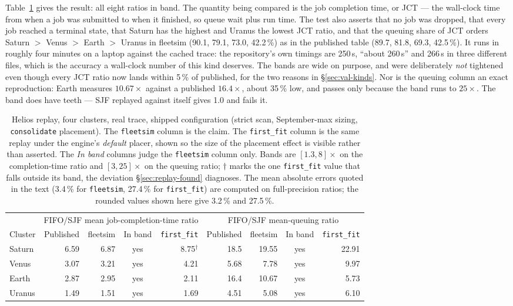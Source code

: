 Table~\ref{tab:helios-ratios} gives the result: all eight ratios in band. The
quantity being compared is the job completion time, or JCT --- the wall-clock
time from when a job was submitted to when it finished, so queue wait plus run
time. The test also asserts that no job was dropped, that every job reached a
terminal state, that Saturn has the highest and Uranus the lowest JCT ratio, and
that the queuing share of JCT orders Saturn $>$ Venus $>$ Earth $>$ Uranus in
fleetsim (90.1, 79.1, 73.0, 42.2\,\%) as in the published table (89.7, 81.8,
69.3, 42.5\,\%). It runs in roughly four minutes on a laptop against the cached
trace: the repository's own timings are 250\,s, ``about 260\,s'' and 266\,s in
three different files, which is the accuracy a wall-clock number of this kind
deserves. The bands are wide on purpose, and were deliberately \emph{not}
tightened even though every JCT ratio now lands within 5\,\% of published, for
the two reasons in \S\ref{sec:val-kinds}. Nor is the queuing column an exact
reproduction: Earth measures $10.67\times$ against a published $16.4\times$,
about 35\,\% low, and passes only because the band runs to $25\times$. The band
does have teeth --- SJF replayed against itself gives 1.0 and fails it.

\begin{table}[t]
\centering\small
\caption{Helios replay, four clusters, real trace, shipped configuration (strict
scan, September-max sizing, \texttt{consolidate} placement). The
\texttt{fleetsim} column is the claim. The \texttt{first\_fit} column is the same
replay under the engine's \emph{default} placer, shown so the size of the
placement effect is visible rather than asserted. The \emph{In band} columns
judge the \texttt{fleetsim} column only. Bands are $[1.3, 8]\times$ on the
completion-time ratio and $[3, 25]\times$ on the queuing ratio; $\dagger$ marks
the one \texttt{first\_fit} value that falls outside its band, the deviation
\S\ref{sec:replay-found} diagnoses. The mean absolute errors quoted in the text
(3.4\,\% for \texttt{fleetsim}, 27.4\,\% for \texttt{first\_fit}) are computed on
full-precision ratios; the rounded values shown here give 3.2\,\% and 27.5\,\%.}
\label{tab:helios-ratios}
\begin{tabular}{lrrcrrrcr}
\toprule
& \multicolumn{4}{c}{FIFO/SJF mean job-completion-time ratio} & \multicolumn{4}{c}{FIFO/SJF mean-queuing ratio} \\
\cmidrule(lr){2-5}\cmidrule(lr){6-9}
Cluster & Published & fleetsim & In band & \texttt{first\_fit} & Published & fleetsim & In band & \texttt{first\_fit} \\
\midrule
Saturn & 6.59 & 6.87 & yes & 8.75$^\dagger$ & 18.5 & 19.55 & yes & 22.91 \\
Venus  & 3.07 & 3.21 & yes & 4.21           & 5.68 & 7.78  & yes & 9.97  \\
Earth  & 2.87 & 2.95 & yes & 2.11           & 16.4 & 10.67 & yes & 5.73  \\
Uranus & 1.49 & 1.51 & yes & 1.69           & 4.51 & 5.08  & yes & 6.10  \\
\bottomrule
\end{tabular}
\end{table}

